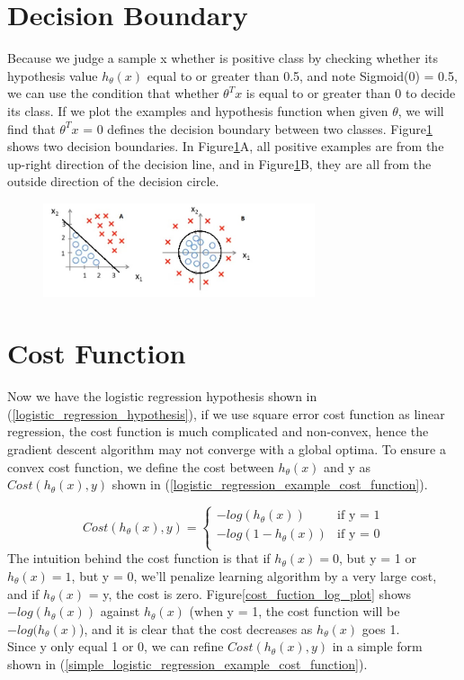 \documentclass{article}
\begin{document}
\section{Decision Boundary}
Because we judge a sample x whether is positive class by checking whether its hypothesis value $h_{\theta}(x)$ equal to or greater than 0.5, and note Sigmoid(0) = 0.5, we can use the condition that whether $\theta^{T}x$ is equal to or greater than 0 to decide its class. If we plot the examples and hypothesis function when given $\theta$, we will find that $\theta^{T}x$ = 0 defines the decision boundary between two classes. Figure\ref{decision_boundary} shows two decision boundaries. In Figure\ref{decision_boundary}A, all positive examples are from the up-right direction of the decision line, and in Figure\ref{decision_boundary}B, they are all from the outside direction of the decision circle.

\begin{figure}[ht]
  \centering
  \includegraphics[width=8cm]{Figure3.jpg}\\
  \caption{}\label{decision_boundary}
\end{figure}

\section{Cost Function}
Now we have the logistic regression hypothesis shown in (\ref{logistic_regression_hypothesis}), if we use square error cost function as linear regression, the cost function is much complicated and non-convex, hence the gradient descent algorithm may not converge with a global optima. To ensure a convex cost function, we define the cost between $h_{\theta}(x)$ and y as $Cost(h_{\theta}(x), y)$ shown in (\ref{logistic_regression_example_cost_function}).

\begin{equation}\label{logistic_regression_example_cost_function}
Cost(h_{\theta}(x), y) = \left\{ \begin{array}{ll}
-log(h_{\theta}(x)) & \textrm{if y = 1}\\
-log(1 - h_{\theta}(x)) & \textrm{if y = 0}\\
\end{array} \right.
\end{equation}
The intuition behind the cost function is that if $h_{\theta}(x) = 0$, but y = 1 or $h_{\theta}(x) = 1$, but y = 0, we'll penalize learning algorithm by a very large cost, and if $h_{\theta}(x)$ = y, the cost is zero. Figure\ref{cost_fuction_log_plot} shows $-log(h_{\theta}(x))$ against $h_{\theta}(x)$ (when y = 1, the cost function will be $-log(h_{\theta}(x)$), and it is clear that the cost decreases as $h_{\theta}(x)$ goes 1.
\\
Since y only equal 1 or 0, we can refine $Cost(h_{\theta}(x), y)$ in a simple form shown in (\ref{simple_logistic_regression_example_cost_function}).
\end{document}

